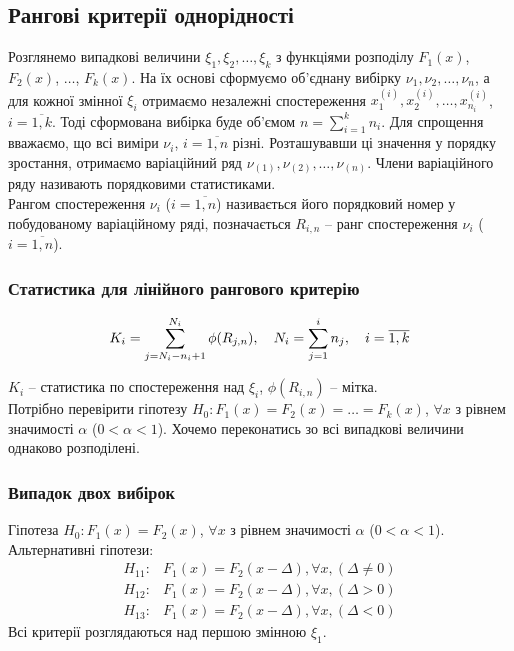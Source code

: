 \subsection{Рангові критерії однорідності}

Розглянемо випадкові величини $\xi_1, \xi_2, \ldots, \xi_k$ з функціями розподілу $F_1(x)$, $F_2(x)$, $\ldots$, $F_k(x)$. На їх основі сформуємо об'єднану вибірку $\nu_1, \nu_2, \ldots, \nu_n$, а для кожної змінної $\xi_i$ отримаємо незалежні спостереження $x_1^{(i)}, x_2^{(i)}, \ldots, x_{n_i}^{(i)}$, $i = \overline{1,k}$. Тоді сформована вибірка буде об'ємом $n = \sum_{i=1}^k n_i$. Для спрощення вважаємо, що всі виміри $\nu_i$, $i=\overline{1,n}$ різні. Розташувавши ці значення у порядку зростання, отримаємо варіаційний ряд $\nu_{(1)}, \nu_{(2)}, \ldots, \nu_{(n)}$. Члени варіаційного ряду називають порядковими статистиками. \\

Рангом спостереження $\nu_i$ ($i = \overline{1,n}$) називається його порядковий номер у побудованому варіаційному ряді, позначається $R_{i,n}$ -- ранг спостереження $\nu_i$ ($i = \overline{1,n}$).

\subsubsection{Статистика для лінійного рангового критерію}

\[ K_i = \displaystyle\sum\limits_{j = N_i - n_i + 1}^{N_i} \phi(R_{j,n}), \quad N_i = \displaystyle\sum\limits_{j=1}^i n_j, \quad i = \overline{1,k} \]

$K_i$ -- статистика по спостереження над $\xi_i$, $\phi(R_{i,n})$ -- мітка. \\

Потрібно перевірити гіпотезу $H_0: F_1(x) = F_2(x) = \ldots = F_k(x)$, $\forall x$ з рівнем значимості $\alpha$ ($0 < \alpha < 1$). Хочемо переконатись зо всі випадкові величини однаково розподілені.

\subsubsection{Випадок двох вибірок}

Гіпотеза $H_0: F_1(x) = F_2(x)$, $\forall x$ з рівнем значимості $\alpha$ ($0 < \alpha < 1$). Альтернативні гіпотези:
\begin{align*}
    H_{11}: & F_1(x) = F_2(x - \Delta), \forall x, (\Delta \ne 0) \\
    H_{12}: & F_1(x) = F_2(x - \Delta), \forall x, (\Delta > 0) \\
    H_{13}: & F_1(x) = F_2(x - \Delta), \forall x, (\Delta < 0)
\end{align*}
Всі критерії розглядаються над першою змінною $\xi_1$. \\


